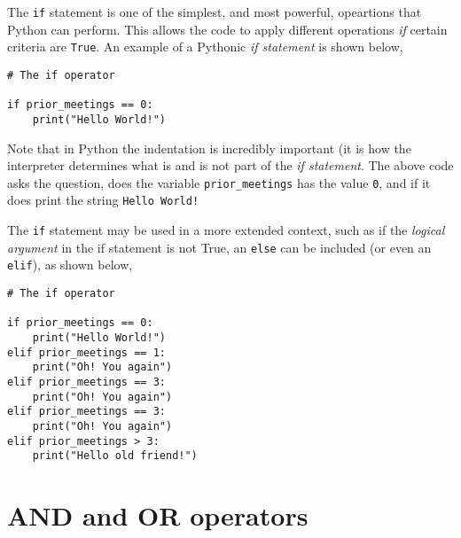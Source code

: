 \documentclass[a4paper]{article}
\begin{document}
The \texttt{if} statement is one of the simplest, and most powerful, opeartions that Python can perform. 
This allows the code to apply different operations \emph{if} certain criteria are \texttt{True}.
An example of a Pythonic \emph{if statement} is shown below, 
\begin{lstlisting}
# The if operator

if prior_meetings == 0:
    print("Hello World!")
\end{lstlisting}
Note that in Python the indentation is incredibly important (it is how the interpreter determines what is and is not part of the \emph{if statement}.
The above code asks the question, does the variable \texttt{prior\_meetings} has the value \texttt{0}, and if it does print the string \texttt{Hello World!}

The \texttt{if} statement may be used in a more extended context, such as if the \emph{logical argument} in the if statement is not True, an \texttt{else} can be included (or even an \texttt{elif}), as shown below,
\begin{lstlisting}
# The if operator

if prior_meetings == 0:
    print("Hello World!")
elif prior_meetings == 1:
    print("Oh! You again")
elif prior_meetings == 3:
    print("Oh! You again")
elif prior_meetings == 3:
    print("Oh! You again")
elif prior_meetings > 3:
	print("Hello old friend!")
\end{lstlisting}

\section{AND and OR operators}
\end{document}

